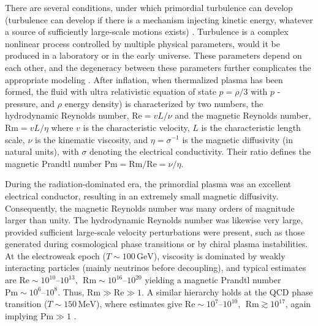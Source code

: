\documentclass[prd,twocolumn,aps,psfig,nobibnotes,superscriptaddress,preprintnumbers,times]{revtex4}
\begin{document}
There are several conditions, under which primordial turbulence can develop (turbulence can develop if there is a mechanism injecting kinetic energy, whatever a source of sufficiently large-scale motions exists)
\cite{Caprini:2018mtu,Hindmarsh:2013xza,Brandenburg:1996fc,Joyce:1997uy}.
Turbulence is a complex nonlinear process controlled by multiple physical parameters, would it be produced in a laboratory or in the early universe. These parameters depend on each other, and the degeneracy between these parameters further complicates the appropriate modeling
\cite{Batchelor:1953,MoninYaglom:1975,Pope:2000}.
After inflation, when thermalized plasma has been formed, the fluid with ultra relativistic equation of state $ p =\rho/3$ with $p$ - pressure, and $\rho$ energy density) is characterized by two numbers, the hydrodynamic Reynolds number,
$\mathrm{Re} = {vL}/{\nu}$ and the magnetic Reynolds number, $\mathrm{Rm} = {vL}/{\eta}$
where $v$ is the characteristic velocity, $L$ is the characteristic length scale, $\nu$ is the kinematic viscosity, and $\eta=\sigma^{-1}$ is the magnetic diffusivity (in natural units), with $\sigma$ denoting the electrical conductivity. Their ratio defines the magnetic Prandtl number $\mathrm{Pm}={\mathrm{Rm}}/{\mathrm{Re}}={\nu}/{\eta}$.

During the radiation-dominated era, the primordial plasma was an excellent electrical conductor, resulting in an extremely small magnetic diffusivity. Consequently, the magnetic Reynolds number was many orders of magnitude larger than unity. The hydrodynamic Reynolds number was likewise very large, provided sufficient large-scale velocity perturbations were present, such as those generated during cosmological phase transitions or by chiral plasma instabilities. At the electroweak epoch ($T\sim100\,\mathrm{GeV}$), viscosity is dominated by weakly interacting particles (mainly neutrinos before decoupling), and typical estimates are
$\mathrm{Re}\sim10^{10}\text{--}10^{13},~~
\mathrm{Rm}\sim10^{16}\text{--}10^{20}$ yielding a magnetic Prandtl number $\mathrm{Pm}\sim10^{6}\text{--}10^{8}$. Thus, $\mathrm{Rm}\gg\mathrm{Re}\gg1 $.  
A similar hierarchy holds at the QCD phase transition ($T\sim150\,\mathrm{MeV}$), where estimates give  $\mathrm{Re}\sim10^{7}\text{--}10^{10}, ~~\mathrm{Rm}\gtrsim10^{17}$,
again implying $\mathrm{Pm}\gg1$
\cite{Son:1998my,Jedamzik:1996wp,Banerjee:2004df,Durrer:2013pga,Subramanian:2015lua}.
\end{document}
